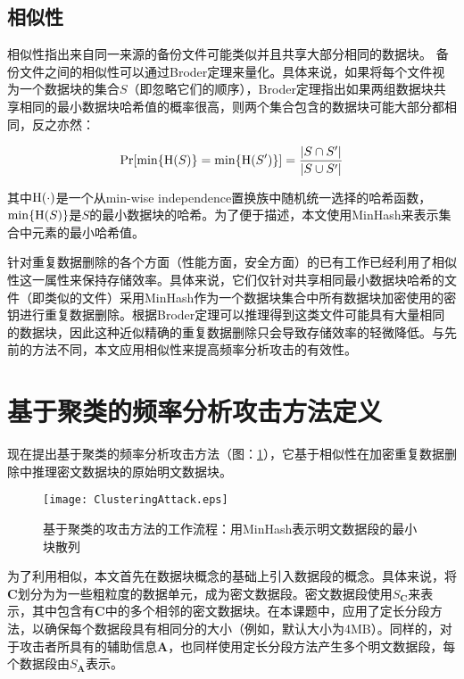 \subsection{相似性}
相似性指出来自同一来源的备份文件可能类似并且共享大部分相同的数据块。 备份文件之间的相似性可以通过Broder定理来量化。具体来说，如果将每个文件视为一个数据块的集合$S$（即忽略它们的顺序），Broder定理指出如果两组数据块共享相同的最小数据块哈希值的概率很高，则两个集合包含的数据块可能大部分都相同，反之亦然：
 
\begin{equation}
	\Pr[\min\{{\rm H}(S)\} = \min\{{\rm H}(S')\} ] = \frac{|S \cap S'|}{|S \cup S'|}
	\label{eq:similary}
\end{equation}

其中${\rm H}(\cdot)$是一个从min-wise independence置换族中随机统一选择的哈希函数，$\min\{{\rm H}(S)\}$是$S$的最小数据块的哈希。为了便于描述，本文使用MinHash来表示集合中元素的最小哈希值。


针对重复数据删除的各个方面（性能方面，安全方面）的已有工作已经利用了相似性这一属性来保持存储效率。具体来说，它们仅针对共享相同最小数据块哈希的文件（即类似的文件）采用MinHash作为一个数据块集合中所有数据块加密使用的密钥进行重复数据删除。根据Broder定理可以推理得到这类文件可能具有大量相同的数据块，因此这种近似精确的重复数据删除只会导致存储效率的轻微降低。与先前的方法不同，本文应用相似性来提高频率分析攻击的有效性。
 
\section{基于聚类的频率分析攻击方法定义}
\label{sec:clustering-attack-description}

现在提出基于聚类的频率分析攻击方法（图：\ref{fig:基于聚类的攻击方法的工作流程}），它基于相似性在加密重复数据删除中推理密文数据块的原始明文数据块。

\begin{figure}[!htb]
    \small
    \centering
    \texttt{[image: ClusteringAttack.eps]}
    \caption{基于聚类的攻击方法的工作流程：用MinHash表示明文数据段的最小块散列} 
    \label{fig:基于聚类的攻击方法的工作流程}
\end{figure}

为了利用相似，本文首先在数据块概念的基础上引入数据段的概念。具体来说，将$\mathbf{C}$划分为为一些粗粒度的数据单元，成为密文数据段。密文数据段使用$S_\mathbf{C}$来表示，其中包含有$\mathbf{C}$中的多个相邻的密文数据块。在本课题中，应用了定长分段方法，以确保每个数据段具有相同分的大小（例如，默认大小为4MB）。同样的，对于攻击者所具有的辅助信息$\mathbf{A}$，也同样使用定长分段方法产生多个明文数据段，每个数据段由$S_\mathbf{A}$表示。

